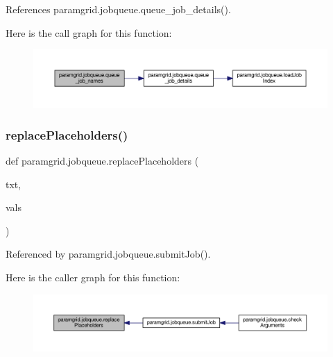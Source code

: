 References paramgrid.\+jobqueue.\+queue\+\_\+job\+\_\+details().

Here is the call graph for this function\+:
\nopagebreak
\begin{figure}[H]
\begin{center}
\leavevmode
\includegraphics[width=350pt]{namespaceparamgrid_1_1jobqueue_a6fab141ec4e778b457d8e3c3f0447037_cgraph}
\end{center}
\end{figure}
\mbox{\label{namespaceparamgrid_1_1jobqueue_a031dc892bb06dea862e0cd66679abf85}} 
\subsubsection{\texorpdfstring{replace\+Placeholders()}{replacePlaceholders()}}
{\footnotesize\ttfamily def paramgrid.\+jobqueue.\+replace\+Placeholders (\begin{DoxyParamCaption}\item[{}]{txt,  }\item[{}]{vals }\end{DoxyParamCaption})}



Referenced by paramgrid.\+jobqueue.\+submit\+Job().

Here is the caller graph for this function\+:
\nopagebreak
\begin{figure}[H]
\begin{center}
\leavevmode
\includegraphics[width=350pt]{namespaceparamgrid_1_1jobqueue_a031dc892bb06dea862e0cd66679abf85_icgraph}
\end{center}
\end{figure}
\mbox{\label{namespaceparamgrid_1_1jobqueue_a691d4fd653c9cc544442a64a98f7d277}} 
